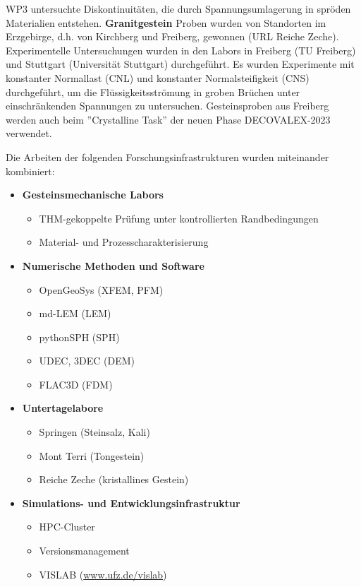 WP3 untersuchte Diskontinuitäten, die durch Spannungsumlagerung in spröden Materialien entstehen. \textbf{Granitgestein} Proben wurden von Standorten im Erzgebirge, d.h. von Kirchberg und Freiberg, gewonnen (URL Reiche Zeche). Experimentelle Untersuchungen wurden in den Labors in Freiberg (TU Freiberg) und Stuttgart (Universität Stuttgart) durchgeführt. Es wurden Experimente mit konstanter Normallast (CNL) und konstanter Normalsteifigkeit (CNS) durchgeführt, um die Flüssigkeitsströmung in groben Brüchen unter einschränkenden Spannungen zu untersuchen. Gesteinsproben aus Freiberg werden auch beim ''Crystalline Task'' der neuen Phase DECOVALEX-2023 verwendet.

Die Arbeiten der folgenden Forschungsinfrastrukturen wurden miteinander kombiniert:
\begin{itemize}
    \item \textbf{Gesteinsmechanische Labors}
	\begin{itemize}
		\item THM-gekoppelte Prüfung unter kontrollierten Randbedingungen
		\item Material- und Prozesscharakterisierung
	\end{itemize}
	\item \textbf{Numerische Methoden und Software}
	\begin{itemize}
		\item OpenGeoSys (XFEM, PFM)
		\item md-LEM (LEM)
		\item pythonSPH (SPH)
		\item UDEC, 3DEC (DEM)
		\item FLAC3D (FDM)
	\end{itemize}
	\item \textbf{Untertagelabore}
	\begin{itemize}
		\item Springen (Steinsalz, Kali)
		\item Mont Terri (Tongestein)
		\item Reiche Zeche (kristallines Gestein)
	\end{itemize}
	\item \textbf{Simulations- und Entwicklungsinfrastruktur}
	\begin{itemize}
		\item HPC-Cluster
		\item Versionsmanagement
		\item VISLAB (\url{www.ufz.de/vislab})
	\end{itemize}
\end{itemize}

